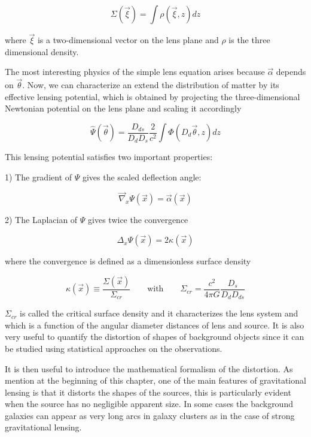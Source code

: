 \begin{equation}
\Sigma(\vec{\xi}) = \int \rho (\vec{\xi},z)dz
\end{equation}

where $\vec{\xi}$ is a two-dimensional vector on the lens plane and $\rho$ is the three dimensional density.

The most interesting physics of the simple lens equation arises because $\vec{\alpha}$ depends on $\vec{\theta}$. Now, we can characterize an extend the distribution of matter by its effective lensing potential, which is obtained by projecting the three-dimensional Newtonian potential on the lens plane and scaling it accordingly

\begin{equation}
\hat{\Psi}(\vec{\theta})=\frac{D_{ds}}{D_{d}D_{s}}\frac{2}{c^{2}}\int\Phi(D_{d}\vec{\theta},z)dz
\end{equation}

This lensing potential satisfies two important properties:

1) The gradient of $\Psi$ gives the scaled deflection angle:

\begin{equation}
\vec{\nabla}_{x}\Psi(\vec{x})=\vec{\alpha}(\vec{x})
\end{equation}

2) The Laplacian of $\Psi$ gives twice the convergence

\begin{equation}
\Delta_{x}\Psi(\vec{x})=2\kappa(\vec{x})
\end{equation}

where the convergence is defined as a dimensionless surface density

\begin{equation}
\kappa(\vec{x})\equiv \frac{\Sigma(\vec{x})}{\Sigma_{cr}}\qquad \text{with} \qquad \Sigma_{cr}=\frac{c^{2}}{4\pi G}\frac{D_s}{D_d D_{ds}}
\end{equation}

$\Sigma_{cr}$ is called the critical surface density and it characterizes the lens system and which is a function of the angular diameter distances of lens and source. It is also very useful to quantify the distortion of shapes of background objects since it can be studied using statistical approaches on the observations.

It is then useful to introduce the mathematical formalism of the distortion. As mention at the beginning of this chapter, one of the main features of gravitational lensing is that it distorts the shapes of the sources, this is particularly evident when the source has no negligible apparent size. In some cases the background galaxies can appear as very long arcs in galaxy clusters as in the case of strong gravitational lensing. 

